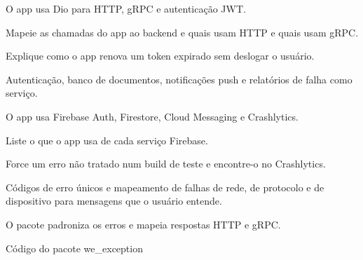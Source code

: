 \begin{noproduto}
O app usa Dio para HTTP, gRPC e autenticação JWT.
\end{noproduto}

\begin{paraestudar}
  \item {}
  \item {}
  \item {}
\end{paraestudar}

\begin{pratique}
  \item Mapeie as chamadas do app ao backend e quais usam HTTP e quais usam gRPC.
  \item Explique como o app renova um token expirado sem deslogar o usuário.
\end{pratique}

Autenticação, banco de documentos, notificações push e relatórios de falha como serviço.

\begin{noproduto}
O app usa Firebase Auth, Firestore, Cloud Messaging e Crashlytics.
\end{noproduto}

\begin{paraestudar}
  \item {}
\end{paraestudar}

\begin{pratique}
  \item Liste o que o app usa de cada serviço Firebase.
  \item Force um erro não tratado num build de teste e encontre-o no Crashlytics.
\end{pratique}

Códigos de erro únicos e mapeamento de falhas de rede, de protocolo e de dispositivo para mensagens que o usuário entende.

\begin{noproduto}
O pacote  padroniza os erros e mapeia respostas HTTP e gRPC.
\end{noproduto}

\begin{paraestudar}
  \item Código do pacote we\_exception
\end{paraestudar}

